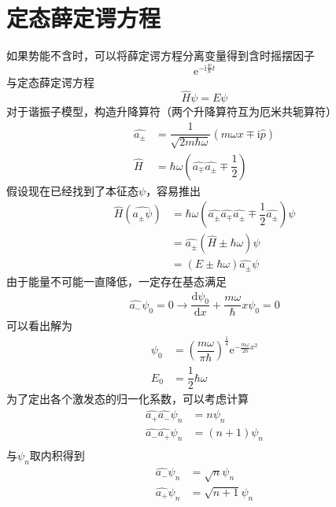 \documentclass[12pt, a4paper, oneside]{ctexart}
\begin{document}
	\section{定态薛定谔方程}
	如果势能不含时，可以将薛定谔方程分离变量得到含时摇摆因子
	\begin{equation}
		\mathrm{e}^{-\mathrm{i}\frac{E}{\hbar}t}
	\end{equation}
	\quad\quad 与定态薛定谔方程
	\begin{equation}
		\hat{H}\psi=E\psi
	\end{equation}
	\quad\quad 对于谐振子模型，构造升降算符（两个升降算符互为厄米共轭算符）
	\begin{align}
		\hat{a_{\pm}}&=\dfrac{1}{\sqrt{2m\hbar\omega}}\left(m\omega x\mp\mathrm{i}\hat{p}\right)\\
		\hat{H}&=\hbar\omega\left(\hat{a_{\mp}}\hat{a_{\pm}}\mp\dfrac{1}{2}\right)
	\end{align}
	\quad\quad 假设现在已经找到了本征态$\psi$，容易推出
	\begin{align}
		\hat{H}\left(\hat{a_{\pm}\psi}\right)&=\hbar\omega\left(\hat{a_{\pm}}\hat{a_{\mp}}\hat{a_{\pm}}\mp\dfrac{1}{2}\hat{a_{\pm}}\right)\psi\\
		&=\hat{a_{\pm}}\left(\hat{H}\pm\hbar\omega\right)\psi\\
		&=\left(E\pm\hbar\omega\right)\hat{a_{\pm}}\psi
	\end{align}
	\quad\quad 由于能量不可能一直降低，一定存在基态满足
	\begin{align}
		\hat{a_{-}}\psi_{0}=0\to\dfrac{\mathrm{d}\psi_{0}}{\mathrm{d}x}+\dfrac{m\omega}{\hbar}x\psi_{0}=0
	\end{align}
	\quad\quad 可以看出解为
	\begin{align}
		\psi_{0}&=\left(\dfrac{m\omega}{\pi\hbar}\right)^{\frac{1}{4}}\mathrm{e}^{-\frac{m\omega}{2\hbar}x^{2}}\\
		E_{0}&=\dfrac{1}{2}\hbar\omega
	\end{align}
	\quad\quad 为了定出各个激发态的归一化系数，可以考虑计算
	\begin{align}
		\hat{a_{+}}\hat{a_{-}}\psi_{n}&=n\psi_{n}\\
		\hat{a_{-}}\hat{a_{+}}\psi_{n}&=(n+1)\psi_{n}\\
	\end{align}
	\quad\quad 与$\psi_{n}$取内积得到
	\begin{align}
		\hat{a_{-}}\psi_{n}&=\sqrt{n}\psi_{n}\\
		\hat{a_{+}}\psi_{n}&=\sqrt{n+1}\psi_{n}\\
	\end{align}
\end{document}
